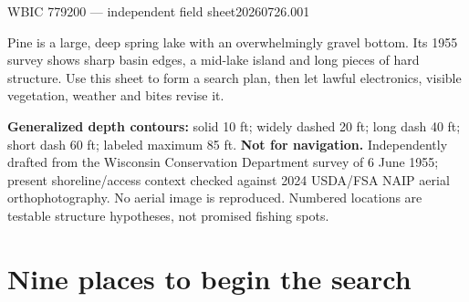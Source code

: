 

  {WBIC 779200 --- independent field sheet}{20260726.001}



Pine is a large, deep spring lake with an overwhelmingly gravel bottom. Its
1955 survey shows sharp basin edges, a mid-lake island and long pieces of hard
structure. Use this sheet to form a search plan, then let lawful electronics,
visible vegetation, weather and bites revise it.

\begin{telosfacts}[0.19]
\end{telosfacts}

\begin{center}


\begin{minipage}{.93\linewidth}
\fontsize{8}{9.3}\selectfont
\textbf{Generalized depth contours:} solid 10 ft; widely dashed 20 ft; long dash 40 ft;
short dash 60 ft; labeled maximum 85 ft. \textbf{Not for navigation.}
Independently drafted from the Wisconsin Conservation Department survey of
6 June 1955; present shoreline/access context checked against 2024 USDA/FSA
NAIP aerial orthophotography. No aerial image is reproduced. Numbered locations
are testable structure hypotheses, not promised fishing spots.
\end{minipage}
\end{center}

\newpage
\section{Nine places to begin the search}

